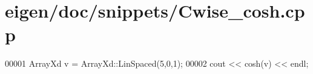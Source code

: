 \hypertarget{eigen_2doc_2snippets_2_cwise__cosh_8cpp_source}{}\section{eigen/doc/snippets/\+Cwise\+\_\+cosh.cpp}
\label{eigen_2doc_2snippets_2_cwise__cosh_8cpp_source}

\begin{DoxyCode}
00001 ArrayXd v = ArrayXd::LinSpaced(5,0,1);
00002 cout << cosh(v) << endl;
\end{DoxyCode}

